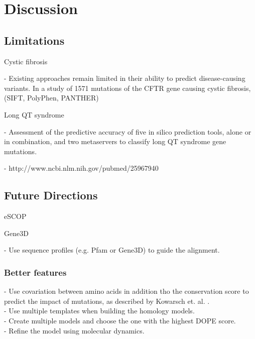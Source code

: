 
\chapter{Discussion}

\section{Limitations}

Cystic fibrosis

  - Existing approaches remain limited in their ability to predict disease-causing variants. In a study of 1571 mutations of the CFTR gene causing cystic fibrosis, (SIFT, PolyPhen, PANTHER) \cite{dorfman_common_2010}

Long QT syndrome

  - Assessment of the predictive accuracy of five in silico prediction tools, alone or in combination, and two metaservers to classify long QT syndrome gene mutations.

  - http://www.ncbi.nlm.nih.gov/pubmed/25967940



\section{Future Directions}


eSCOP

Gene3D

- Use sequence profiles (e.g. Pfam or Gene3D) to guide the alignment.


\subsection{Better features}



- Use covariation between amino acids in addition tho the conservation score to predict the impact of mutations, as described by Kowarsch et. al. \cite{kowarsch_correlated_2010}. \\



- Use multiple templates when building the homology models. \\
- Create multiple models and choose the one with the highest DOPE score. \\
- Refine the model using molecular dynamics. \\

